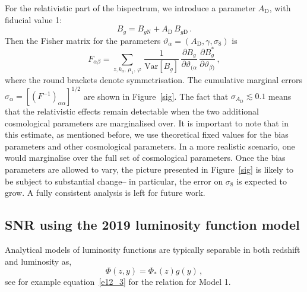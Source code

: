 For the relativistic part of the bispectrum, we introduce a parameter  $A_{\mathrm{D}}$, with fiducial value 1: 
\begin{equation}
B_g=B_{g\mathrm{N}}+A_{\mathrm{D}}\,B_{g\mathrm{D}} \,.
\end{equation}
Then the Fisher matrix for the parameters  $\vartheta_\alpha=(A_{\mathrm{D}},\gamma,\sigma_8)$ is
\begin{equation}
F_{\alpha\beta} = 
\sum_{z,k_a,\,\mu_{1},\,\varphi}\,\frac{1}{{\mathrm{Var}} [{B_{g}}]}
\,\frac{\partial B_{g}}{\partial \vartheta_{(\alpha}}\,\frac{\partial B^*_{g}}{\partial \vartheta_{\beta)}}\,,\label{fm}
\end{equation} 
where the round brackets denote symmetrisation. The cumulative marginal errors $\sigma_\alpha = [(F^{-1})_{\alpha\alpha}]^{1/2}$  are shown in Figure~\ref{sig}. The fact that $\sigma_{A_{\mathrm{D}}}\lesssim 0.1$  means that the relativistic effects remain detectable when the two additional cosmological parameters are marginalised over. It is important to note that in this estimate, as mentioned before, we use theoretical fixed values for the bias parameters and other cosmological parameters. In a more realistic scenario, one would marginalise over the full set of cosmological parameters. Once the bias parameters are allowed to vary, the picture presented in Figure~\ref{sig} is likely to be subject to substantial change-- in particular, the error on $\sigma_8$ is expected to grow. A fully consistent analysis is left for future work. 


%

\subsection{SNR using the 2019 luminosity function model}\label{ssec:snrmodel3}

Analytical models of luminosity functions are typically separable in both redshift and luminosity as, 
\begin{equation}
    \Phi(z,y) = \Phi_*(z) g(y)\,,
\end{equation}
see for example equation~\eqref{e12_3} for the relation for Model 1. 

